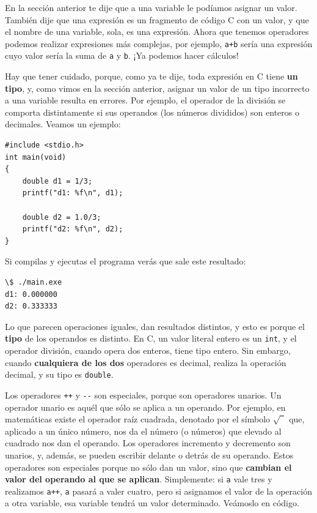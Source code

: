 \documentclass[a4paper]{article}
\begin{document}
En la sección anterior te dije que a una variable le podíamos asignar un valor.
También dije que una expresión es un fragmento de código C con un valor, y que
el nombre de una variable, sola, es una expresión. Ahora que tenemos operadores
podemos realizar expresiones más complejas, por ejemplo, \verb!a+b! sería una
expresión cuyo valor sería la suma de \verb!a! y \verb!b!. ¡Ya podemos hacer
cálculos!

Hay que tener cuidado, porque, como ya te dije, toda expresión en C tiene
\textbf{un tipo}, y, como vimos en la sección anterior, asignar un valor de
un tipo incorrecto a una variable resulta en errores. Por ejemplo, el operador
de la división se comporta distintamente si sus operandos (los números
divididos) son enteros o decimales. Veamos un ejemplo:


\noindent
\begin{minipage}[H]{\linewidth}
\mbox{}
\begin{lstlisting}[style=C, caption={División entera contra división
decimal},
label={lst:decimalvsintergerDivision}]
#include <stdio.h>
int main(void)
{
    double d1 = 1/3;
    printf("d1: %f\n", d1);

    double d2 = 1.0/3;
    printf("d2: %f\n", d2);
}
\end{lstlisting}
\end{minipage}


Si compilas y ejecutas el programa verás que sale este resultado:


\noindent
\begin{minipage}[H]{\linewidth}
\mbox{}
\begin{lstlisting}[style=terminalStyle]
\$ ./main.exe
d1: 0.000000
d2: 0.333333
\end{lstlisting}
\end{minipage}



Lo que parecen operaciones iguales, dan resultados distintos, y esto es porque
el \textbf{tipo} de los operandos es distinto. En C, un valor literal entero
es un \verb!int!, y el operador división, cuando opera dos enteros, tiene tipo
entero. Sin embargo, cuando \textbf{cualquiera de los dos} operadores es
decimal, realiza la operación decimal, y su tipo es \verb!double!.

Los operadores \verb!++! y \verb!--! son especiales, porque son operadores
unarios. Un operador unario es aquél que sólo se aplica a un operando. Por
ejemplo, en matemáticas existe el operador raíz cuadrada, denotado por el
símbolo $\sqrt{\phantom{2}}$ que, aplicado a un único número, nos da
el número (o números) que elevado al cuadrado nos dan el operando.
Los operadores incremento y decremento son unarios, y, además, se
pueden escribir delante o detrás de su operando. Estos operadores son
especiales porque no sólo dan un valor, sino que \textbf{cambian el valor
del operando al que se aplican}. Simplemente: si \verb!a! vale tres y realizamos
\verb!a++!, \verb!a! pasará a valer cuatro, pero si asignamos el valor de la
operación a otra variable, esa variable tendrá un valor determinado.
Veámoslo en código.
\end{document}
